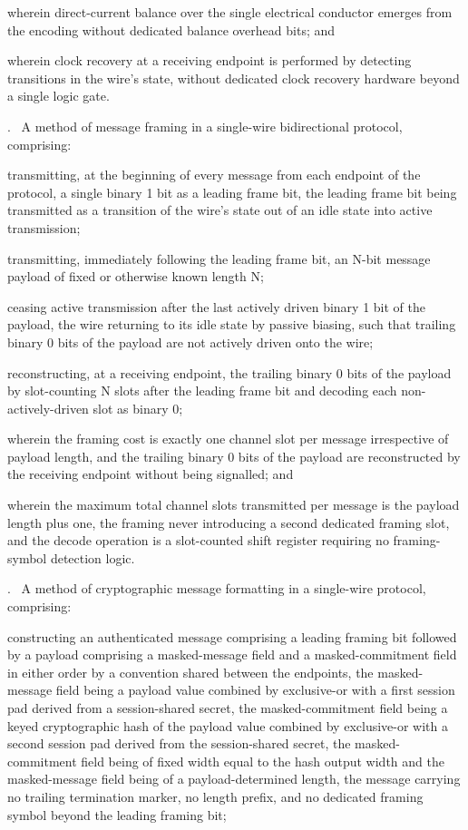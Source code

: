 \documentclass[12pt,letterpaper]{article}
\newcounter{claim}
\newcommand{\claim}[1]{\medskip\par\refstepcounter{claim}\noindent\arabic{claim}.~\label{clm:#1}\ignorespaces}
\begin{document}
wherein direct-current balance over the single electrical conductor emerges from the encoding without dedicated balance overhead bits; and

wherein clock recovery at a receiving endpoint is performed by detecting transitions in the wire's state, without dedicated clock recovery hardware beyond a single logic gate.

\claim{framing} A method of message framing in a single-wire bidirectional protocol, comprising:

transmitting, at the beginning of every message from each endpoint of the protocol, a single binary 1 bit as a leading frame bit, the leading frame bit being transmitted as a transition of the wire's state out of an idle state into active transmission;

transmitting, immediately following the leading frame bit, an N-bit message payload of fixed or otherwise known length N;

ceasing active transmission after the last actively driven binary 1 bit of the payload, the wire returning to its idle state by passive biasing, such that trailing binary 0 bits of the payload are not actively driven onto the wire;

reconstructing, at a receiving endpoint, the trailing binary 0 bits of the payload by slot-counting N slots after the leading frame bit and decoding each non-actively-driven slot as binary 0;

wherein the framing cost is exactly one channel slot per message irrespective of payload length, and the trailing binary 0 bits of the payload are reconstructed by the receiving endpoint without being signalled; and

wherein the maximum total channel slots transmitted per message is the payload length plus one, the framing never introducing a second dedicated framing slot, and the decode operation is a slot-counted shift register requiring no framing-symbol detection logic.

\claim{msgformat} A method of cryptographic message formatting in a single-wire protocol, comprising:

constructing an authenticated message comprising a leading framing bit followed by a payload comprising a masked-message field and a masked-commitment field in either order by a convention shared between the endpoints, the masked-message field being a payload value combined by exclusive-or with a first session pad derived from a session-shared secret, the masked-commitment field being a keyed cryptographic hash of the payload value combined by exclusive-or with a second session pad derived from the session-shared secret, the masked-commitment field being of fixed width equal to the hash output width and the masked-message field being of a payload-determined length, the message carrying no trailing termination marker, no length prefix, and no dedicated framing symbol beyond the leading framing bit;
\end{document}

